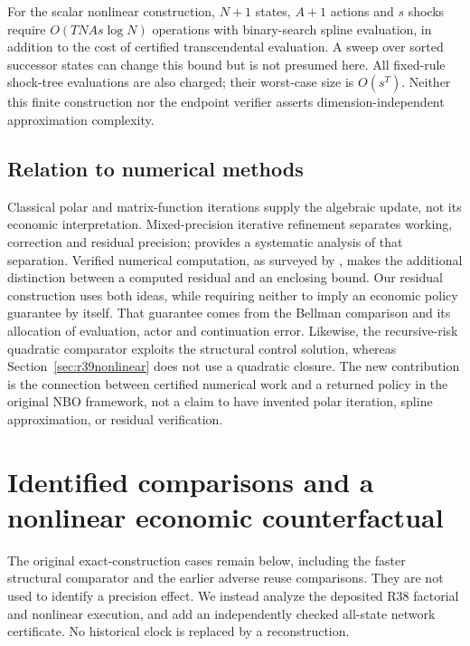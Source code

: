 \documentclass[ecta,nameyear,draft]{econsocart}
\theoremstyle{definition}
\theoremstyle{remark}
\begin{document}
For the scalar nonlinear construction, $N+1$ states, $A+1$ actions and $s$
shocks require $O(TNAs\log N)$ operations with binary-search spline evaluation,
in addition to the cost of certified transcendental evaluation. A sweep over
sorted successor states can change this bound but is not presumed here.
All fixed-rule shock-tree evaluations are also charged; their worst-case size
is $O(s^T)$. Neither this finite construction nor the endpoint verifier asserts
dimension-independent approximation complexity.

\subsection{Relation to numerical methods}
Classical polar and matrix-function iterations supply the algebraic update,
not its economic interpretation. Mixed-precision iterative refinement separates
working, correction and residual precision; \citet{CarsonHigham2018R39} provides
a systematic analysis of that separation. Verified numerical computation, as
surveyed by \citet{Rump2010R39}, makes the additional distinction between a
computed residual and an enclosing bound. Our residual construction uses both
ideas, while requiring neither to imply an economic policy guarantee by
itself. That guarantee comes from the Bellman comparison and its allocation
of evaluation, actor and continuation error. Likewise, the recursive-risk
quadratic comparator exploits the structural control solution, whereas
Section~\ref{sec:r39nonlinear} does not use a quadratic closure. The new
contribution is the connection between certified numerical work and a returned
policy in the original NBO framework, not a claim to have invented polar
iteration, spline approximation, or residual verification.

\section{Identified comparisons and a nonlinear economic counterfactual}
\label{sec:r39evidence}

The original exact-construction cases remain below, including the faster
structural comparator and the earlier adverse reuse comparisons. They are not
used to identify a precision effect. We instead analyze the deposited R38
factorial and nonlinear execution, and add an independently checked all-state
network certificate. No historical clock is replaced by a reconstruction.
\end{document}
